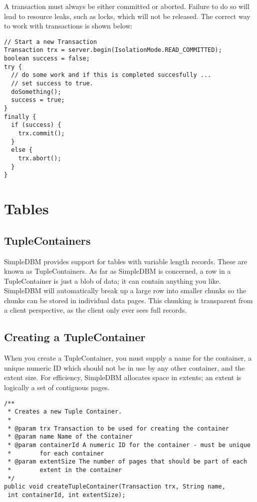 \documentclass[a4paper,draft,oneside]{book}
\begin{document}
A transaction must always be either committed or aborted. Failure to do
so will lead to resource leaks, such as locks, which will not be released.
The correct way to work with transactions is shown below:

\begin{verbatim}
// Start a new Transaction
Transaction trx = server.begin(IsolationMode.READ_COMMITTED);
boolean success = false;
try {
  // do some work and if this is completed succesfully ...
  // set success to true.
  doSomething();
  success = true;
}
finally {
  if (success) {
    trx.commit();
  }
  else {
    trx.abort();
  }
}
\end{verbatim}

\chapter{Tables}

\section{TupleContainers}

SimpleDBM provides support for tables with variable length records.
These are known as TupleContainers.  As far as SimpleDBM is concerned,
a row in a TupleContainer is just a blob of data; it can contain
anything you like. SimpleDBM will automatically break up a large row
into smaller chunks so the chunks can be stored in individual data
pages. This chunking is transparent from a client perspective, as the
client only ever sees full records.

\section{Creating a TupleContainer}

When you create a TupleContainer, you must supply a name for the
container, a unique numeric ID which should not be in use by any other
container, and the extent size. For efficiency, SimpleDBM allocates
space in extents; an extent is logically a set of contiguous pages.

\begin{verbatim}
/**
 * Creates a new Tuple Container. 
 * 
 * @param trx Transaction to be used for creating the container
 * @param name Name of the container
 * @param containerId A numeric ID for the container - must be unique 
 *        for each container
 * @param extentSize The number of pages that should be part of each 
 *        extent in the container
 */
public void createTupleContainer(Transaction trx, String name,
 int containerId, int extentSize);
\end{verbatim}
\end{document}

